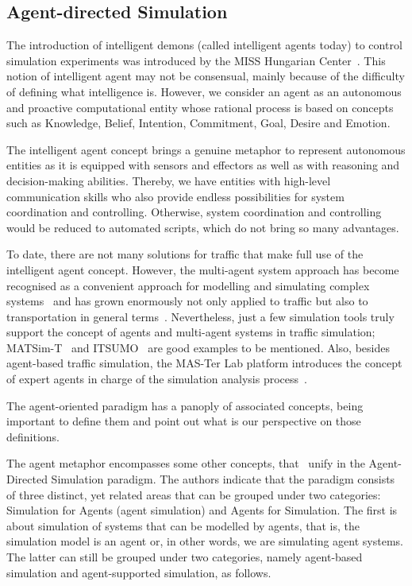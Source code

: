 \documentclass[conference]{IEEEtran}
\begin{document}
\subsection{Agent-directed Simulation}

The introduction of intelligent demons (called intelligent agents today) to control simulation experiments was introduced by the MISS Hungarian Center~\cite{Javor2012}. This notion of intelligent agent may not be consensual, mainly because of the difficulty of defining what intelligence is. However, we consider an agent as an autonomous and proactive computational entity whose rational process is based on concepts such as Knowledge, Belief, Intention, Commitment, Goal, Desire and Emotion.

The intelligent agent concept brings a genuine metaphor to represent autonomous entities as it is equipped with sensors and effectors as well as with reasoning and decision-making abilities. Thereby, we have entities with high-level communication skills who also provide endless possibilities for system coordination and controlling. Otherwise, system coordination and controlling would be reduced to automated scripts, which do not bring so many advantages.

To date, there are not many solutions for traffic that make full use of the intelligent agent concept. However, the multi-agent system approach has become recognised as a convenient approach for modelling and simulating complex systems~\cite{moya2007towards} and has grown enormously not only applied to traffic but also to transportation in general terms~\cite{bazzan2013review}. Nevertheless, just a few simulation tools truly support the concept of agents and multi-agent systems in traffic simulation; MATSim-T~\cite{balmer2009matsim} and ITSUMO~\cite{bazzan2010itsumo} are good examples to be mentioned. Also, besides agent-based traffic simulation, the MAS-Ter Lab platform introduces the concept of expert agents in charge of the simulation analysis process~\cite{rossetti2007}.


The agent-oriented paradigm has a panoply of associated concepts, being important to define them and point out what is our perspective on those definitions.

The agent metaphor encompasses some other concepts, that~\cite{yilmaz2007agent} unify in the Agent-Directed Simulation paradigm. The authors indicate that the paradigm consists of three distinct, yet related areas that can be grouped under two categories: Simulation for Agents (agent simulation) and Agents for Simulation. The first is about simulation of systems that can be modelled by agents, that is, the simulation model is an agent or, in other words, we are simulating agent systems. The latter can still be grouped under two categories, namely agent-based simulation and agent-supported simulation, as follows.
\end{document}
